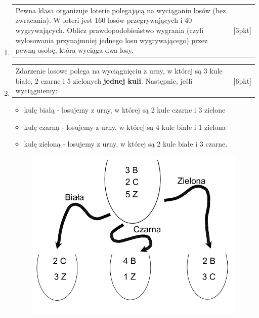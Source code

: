 \documentclass[12pt,a4paper]{article}
\begin{document}
\begin{enumerate}[1.]
		
		\newpage
		
		
		
		\item \begin{tabular}{p{13cm} r}
			Pewna klasa organizuje loterie polegającą na wyciąganiu losów (bez zwracania). W loteri jest 160 losów przegrywających i 40 wygrywających. Oblicz prawdopodobieństwo wygrania (czyli wylosowania przynajmniej jednego losu wygrywającego) przez pewną osobę, która wyciąga dwa losy.	  &[3pkt]\\ 
		\end{tabular}
		
		\item \begin{tabular}{p{13cm} r}
			Zdarzenie losowe polega na wyciągnięciu z urny, w której są 3 kule białe, 2 czarne i 5 zielonych \textbf{jednej kuli}. Następnie, jeśli wyciągniemy:	  &[6pkt]\\ 
		\end{tabular}
		
		\begin{itemize}
			\item kulę białą - losujemy z urny, w której są 2 kule czarne i 3 zielone
			\item kulę czarną - losujemy z urny, w której są 4 kule białe i 1 zielona
			\item kulę zieloną - losujemy z urny, w której są 2 kule białe i 3 czarne.
		\end{itemize}
		
		\begin{figure}[h]
			\centering
			\includegraphics[scale=0.4]{rpt1.jpeg}
		\end{figure}
		

\end{enumerate}
\end{document}
